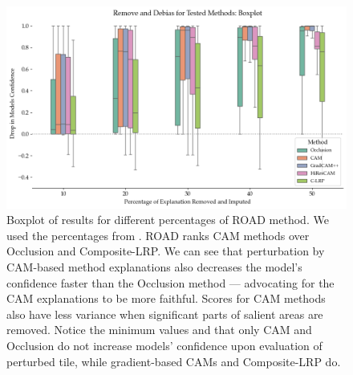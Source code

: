 \begin{figure}
    \begin{center}
    \begin{minipage}{1\textwidth}
      \includegraphics[width=\textwidth]{img/road-boxplot.png}
    \end{minipage}
    \caption{Boxplot of results for different percentages of ROAD method. We used the percentages from \cite{road}. ROAD ranks CAM methods over Occlusion and Composite-LRP. We can see that perturbation by CAM-based method explanations also decreases the model's confidence faster than the Occlusion method --- advocating for the CAM explanations to be more faithful. Scores for CAM methods also have less variance when significant parts of salient areas are removed. Notice the minimum values and that only CAM and Occlusion do not increase models' confidence upon evaluation of perturbed tile, while gradient-based CAMs and Composite-LRP do.}
    \label{fig:road-boxplot}
    \end{center}
\end{figure}

